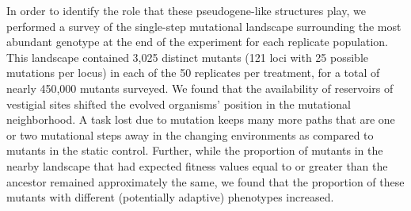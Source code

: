 \documentclass[letterpaper]{article}
\begin{document}
In order to identify the role that these pseudogene-like structures play, we performed a survey of the single-step mutational landscape surrounding the
most abundant genotype at the end of the experiment for
each replicate population. This landscape contained 
3,025 distinct mutants (121 loci with 25 possible mutations per locus) in each of the 50 replicates per treatment, for a total of nearly 450,000 mutants surveyed.
We found that the availability of reservoirs of vestigial sites shifted the evolved organisms'%
position in the mutational neighborhood. %
A task lost due to mutation keeps many more paths that are one or two mutational steps away in the changing environments as compared to mutants in the static control.
Further, while the proportion of mutants in the nearby landscape that had expected fitness values equal to or greater than the ancestor
remained approximately the same, we found that the proportion of these mutants with different (potentially adaptive) phenotypes increased.
\end{document}
